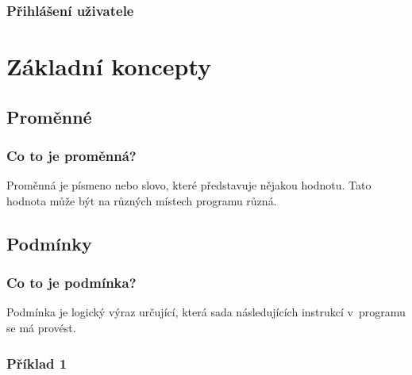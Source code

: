 \documentclass[aspectratio=169,11pt,handout]{beamer}
\begin{document}
\begin{frame}
 \frametitle{Přihlášení uživatele}
 \centering
 \begin{minipage}{.8\textwidth}
 \end{minipage}
\end{frame}

\section[Základní koncepty]{Základní koncepty}
\subsection[Proměnné]{Proměnné}

\begin{frame}
 \frametitle{Co to je proměnná?}
 \begin{tcolorbox}[title=Proměnná,center,width=.9\textwidth]
  Proměnná je písmeno nebo slovo, které \alert{představuje nějakou hodnotu}.
  Tato hodnota může být na různých místech programu různá.
 \end{tcolorbox}
\end{frame}

\subsection[Podmínky]{Podmínky}

\begin{frame}
 \frametitle{Co to je podmínka?}
 \begin{tcolorbox}[title=Podmínka,center,width=.9\textwidth]
  Podmínka je \alert{logický výraz} určující, která sada následujících instrukcí
  v~programu se má provést.
 \end{tcolorbox}
\end{frame}

\begin{frame}
 \frametitle{Příklad 1}
 \centering
 \begin{minipage}{.8\textwidth}
  \begin{algorithm}[H]
   \DontPrintSemicolon
   \BlankLine

  \end{algorithm}
 \end{minipage}
\end{frame}
\end{document}
